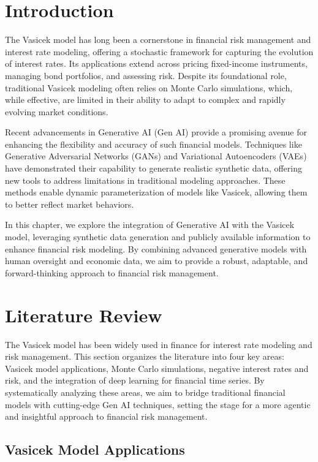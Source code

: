 \documentclass[a4paper,headinclude=on,footinclude=on,12pt,oneside]{scrbook}
\begin{document}
\section{Introduction}

The Vasicek model has long been a cornerstone in financial risk management and interest rate modeling, offering a stochastic framework for capturing the evolution of interest rates. Its applications extend across pricing fixed-income instruments, managing bond portfolios, and assessing risk. Despite its foundational role, traditional Vasicek modeling often relies on Monte Carlo simulations, which, while effective, are limited in their ability to adapt to complex and rapidly evolving market conditions.

Recent advancements in Generative AI (Gen AI) provide a promising avenue for enhancing the flexibility and accuracy of such financial models. Techniques like Generative Adversarial Networks (GANs) and Variational Autoencoders (VAEs) have demonstrated their capability to generate realistic synthetic data, offering new tools to address limitations in traditional modeling approaches. These methods enable dynamic parameterization of models like Vasicek, allowing them to better reflect market behaviors.

In this chapter, we explore the integration of Generative AI with the Vasicek model, leveraging synthetic data generation and publicly available information to enhance financial risk modeling. By combining advanced generative models with human oversight and economic data, we aim to provide a robust, adaptable, and forward-thinking approach to financial risk management.

\section{Literature Review}

The Vasicek model has been widely used in finance for interest rate modeling and risk management. This section organizes the literature into four key areas: Vasicek model applications, Monte Carlo simulations, negative interest rates and risk, and the integration of deep learning for financial time series. By systematically analyzing these areas, we aim to bridge traditional financial models with cutting-edge Gen AI techniques, setting the stage for a more agentic and insightful approach to financial risk management.

\subsection{Vasicek Model Applications}
\end{document}
